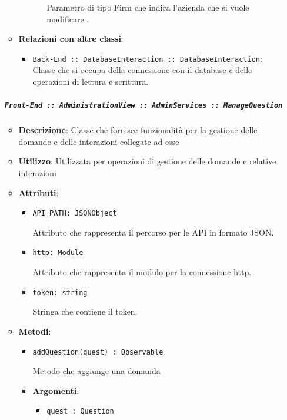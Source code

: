 \documentclass[../DefinizioneDiProdotto.tex]{subfiles}
\begin{document}
\begin{itemize}
\begin{itemize}
\begin{itemize}
\begin{itemize}
	 Parametro di tipo Firm che indica l'azienda che si vuole modificare .
	\end{itemize}
	\end{itemize}\vspace{0.5em}
	\item \textbf{Relazioni con altre classi}:
	\begin{itemize}
	\item \texttt{Back-End :: DatabaseInteraction :: DatabaseInteraction}: Classe che si occupa della connessione con il database e delle operazioni di lettura e scrittura.
	\end{itemize}
	\end{itemize}\subparagraph{\texttt{Front-End :: AdministrationView :: AdminServices :: ManageQuestion}}
	\begin{itemize}\item \textbf{Descrizione}: Classe che fornisce funzionalità per la gestione delle domande e delle interazioni collegate ad esse
	\item \textbf{Utilizzo}: Utilizzata per operazioni di gestione delle domande e relative interazioni
	\item \textbf{Attributi}:
	\begin{itemize}
	\item \texttt{API\_PATH: JSONObject}\

	 Attributo che rappresenta il percorso per le API in formato JSON.
	\end{itemize}
	\begin{itemize}
	\item \texttt{http: Module}\

	 Attributo che rappresenta il modulo per la connessione http.
	\end{itemize}
	\begin{itemize}
	\item \texttt{token: string}\

	 Stringa che contiene il token.
	\end{itemize}
	\item \textbf{Metodi}:
	\begin{itemize}
	\item \texttt{addQuestion(quest) : Observable}\

	 Metodo che aggiunge una domanda

	\item \textbf{Argomenti}:
	\begin{itemize}
	\item \texttt{quest : Question}\


\end{itemize}
\end{itemize}
\end{itemize}
\end{itemize}
\end{document}
